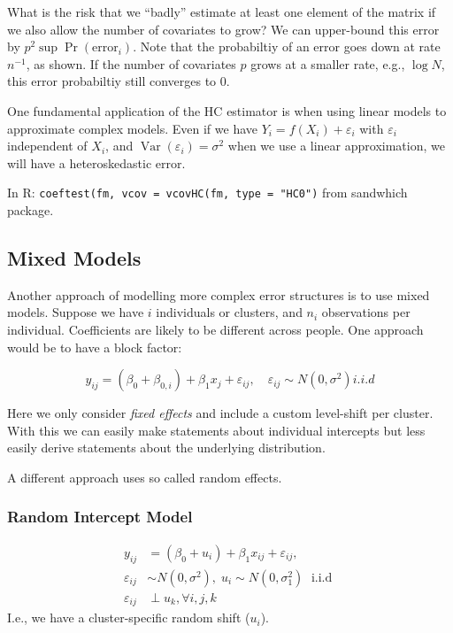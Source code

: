\documentclass[11pt, %
	oneside, %
	english, %
	onehalfspacing, %
	]{article} %
\numberwithin{equation}{section}
\begin{document}
What is the risk that we ``badly'' estimate at least one element of the matrix if we also allow the number of covariates to grow? We can upper-bound this error by $p^2 \sup \operatorname{Pr}\left(\text {error}_i\right)$. Note that the probabiltiy of an error goes down at rate $n^{-1}$, as shown. If the number of covariates $p$ grows at a smaller rate, e.g., $\log N$, this error probabiltiy still converges to 0.



One fundamental application of the HC estimator is when using linear models to approximate complex models. Even if we have $Y_i = f(X_i) + \varepsilon_i$ with $\varepsilon_i$ independent of $X_i$, and $\operatorname{Var}(\varepsilon_i) = \sigma^2$  when we use a linear approximation, we will have a heteroskedastic error.

In R: \lstinline|coeftest(fm, vcov = vcovHC(fm, type = "HC0")| from sandwhich package.


\subsection{Mixed Models}

Another approach of modelling more complex error structures is to use mixed models. Suppose we have $i$ individuals or clusters, and $n_i$ observations per individual. Coefficients are likely to be different across people. One approach would be to have a block factor:

\begin{equation*}
    y_{i j}=\left(\beta_0+\beta_{0, i}\right)+\beta_1 x_j+\varepsilon_{i j}, \quad \varepsilon_{i j} \sim N\left(0, \sigma^2\right) i . i . d
\end{equation*}

Here we only consider \emph{fixed effects} and include a custom level-shift per cluster. With this we can easily make statements about individual intercepts but less easily derive statements about the underlying distribution.

A different approach uses so called random effects.

\subsubsection*{Random Intercept Model}

\begin{align*}
    y_{i j}&=\left(\beta_0+u_i\right)+\beta_1 x_{i j}+\varepsilon_{i j}, \\
    \varepsilon_{i j} &\sim N\left(0, \sigma^2\right), \; u_i \sim N\left(0, \sigma_1^2\right) \; \text { i.i.d } \\
    \varepsilon_{ij} &\perp u_k, \forall i, j, k
\end{align*}
I.e., we have a cluster-specific random shift ($u_i$).
\end{document}
